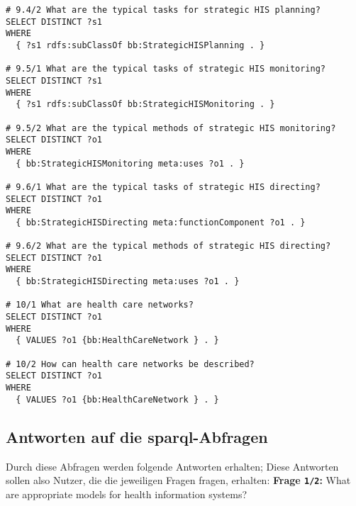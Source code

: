 \begin{lstlisting}[language=SPARQL]
# 9.4/2 What are the typical tasks for strategic HIS planning?
SELECT DISTINCT ?s1
WHERE
  { ?s1 rdfs:subClassOf bb:StrategicHISPlanning . }

# 9.5/1 What are the typical tasks of strategic HIS monitoring?
SELECT DISTINCT ?s1
WHERE
  { ?s1 rdfs:subClassOf bb:StrategicHISMonitoring . }

# 9.5/2 What are the typical methods of strategic HIS monitoring?
SELECT DISTINCT ?o1
WHERE
  { bb:StrategicHISMonitoring meta:uses ?o1 . }

# 9.6/1 What are the typical tasks of strategic HIS directing?
SELECT DISTINCT ?o1
WHERE
  { bb:StrategicHISDirecting meta:functionComponent ?o1 . }

# 9.6/2 What are the typical methods of strategic HIS directing?
SELECT DISTINCT ?o1
WHERE
  { bb:StrategicHISDirecting meta:uses ?o1 . }

# 10/1 What are health care networks?
SELECT DISTINCT ?o1
WHERE
  { VALUES ?o1 {bb:HealthCareNetwork } . }

# 10/2 How can health care networks be described?
SELECT DISTINCT ?o1
WHERE
  { VALUES ?o1 {bb:HealthCareNetwork } . }

\end{lstlisting}

\subsection[Antworten auf die SPARQL-Abfragen]{Antworten auf die \ac{sparql}-Abfragen}

Durch diese Abfragen werden folgende Antworten erhalten;
Diese Antworten sollen also Nutzer, die die jeweiligen Fragen fragen, erhalten:
\textbf{Frage \texttt{1/2}:} What are appropriate models for health information systems?

